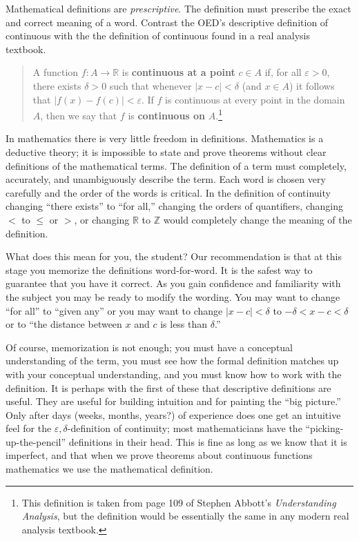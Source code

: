 Mathematical definitions are \emph{prescriptive}. The definition must prescribe the exact and correct meaning  of a word. Contrast the OED's descriptive definition of continuous with the the definition of continuous found in a real analysis textbook.
\begin{quote}
A function $f:A\to \mathbb{R}$ is \textbf{continuous at a point} $c\in A$ if,  for all $\varepsilon>0$, there exists $\delta>0$ such that whenever $|x-c|<\delta$ (and $x\in A$) it follows that $|f(x)-f(c)|<\varepsilon$. If $f$ is continuous at every point in the domain $A$, then we say that $f$ is \textbf{continuous on} $A$.\footnote{This definition is taken from page 109 of Stephen Abbott's \emph{Understanding Analysis}, but the definition would be essentially the same in any modern real analysis textbook.} 
\end{quote}
In mathematics there is very little freedom in definitions. Mathematics is a deductive theory; it is impossible to state and prove theorems without clear definitions of the mathematical terms. The definition of a term must completely, accurately, and unambiguously describe the term. Each word is chosen very carefully and the order of the words is  critical. In the definition of continuity changing ``there exists'' to ``for all,'' changing the orders of quantifiers, changing $<$ to $\leq$ or $>$, or changing $\mathbb{R}$ to $\mathbb{Z}$ would completely change the meaning of the definition. 

What does this mean for you, the student? Our recommendation is that at this stage you memorize the definitions word-for-word. It is the safest way to guarantee that you have it correct. As you gain confidence and familiarity with the subject you may be ready to modify the wording. You may want to change ``for all'' to ``given any'' or you may want to change $|x-c|<\delta$ to $-\delta<x-c<\delta$ or to ``the distance between $x$ and $c$ is less than $\delta$.'' 

Of course, memorization is not enough; you must have a conceptual understanding of the term, you must see how the formal definition matches up with your conceptual understanding, and you must know how to work with the definition. It is perhaps with the first of these that descriptive definitions are useful. They are useful for building intuition and for painting the ``big picture.'' Only after days (weeks, months, years?) of experience does one get an intuitive feel for the $\varepsilon,\delta$-definition of continuity; most mathematicians have the ``picking-up-the-pencil'' definitions in their head. This is fine as long as we know that it is imperfect, and that when we prove theorems about continuous functions mathematics we use the mathematical definition. 

